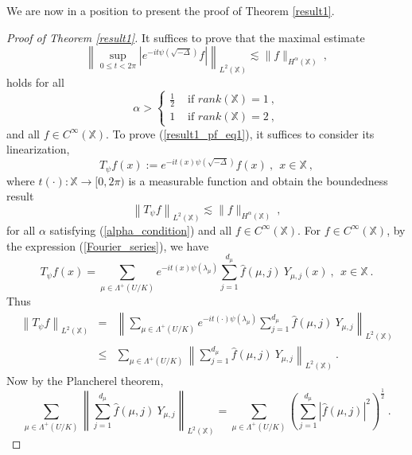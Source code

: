 \documentclass[12pt]{amsart}
\theoremstyle{definition}
\newcommand{\what}{\widehat}
\newcommand{\X}{\mathbb X}%
\numberwithin{equation}{section}
\begin{document}
We are now in a position to present the proof of Theorem \ref{result1}.
\begin{proof}[Proof of Theorem \ref{result1}]
It suffices to prove that the maximal estimate
\begin{equation} \label{result1_pf_eq1}
\left\|\sup_{0 \le t < 2\pi} \left|e^{-it\psi\left(\sqrt{-\Delta}\right)} f \right|\right\|_{L^2(\X)} \lesssim \|f\|_{H^\alpha(\X)}\:,
\end{equation}
holds for all 
\begin{equation} \label{alpha_condition} 
\alpha > \begin{cases}
	 \frac{1}{2}  &\text{ if } rank(\X)=1\:, \\
	 1  &\text{ if } rank(\X)=2\:,
	\end{cases}
\end{equation}
and all $f \in C^\infty(\X)$. To prove (\ref{result1_pf_eq1}), it suffices to consider its linearization,
\begin{equation*}
T_\psi f(x):= e^{-it(x)\psi\left(\sqrt{-\Delta}\right)} f(x)\:,\:\: x \in \X\:,
\end{equation*}
where $t(\cdot):\X \to [0,2\pi)$ is a measurable function and obtain the boundedness result
\begin{equation} \label{result1_pf_eq2}
\left\|T_\psi f\right\|_{L^2(\X)} \lesssim \|f\|_{H^\alpha(\X)}\:,
\end{equation}
for all $\alpha$ satisfying (\ref{alpha_condition}) and all $f \in C^\infty(\X)$. For $f \in C^\infty(\X)$, by the expression (\ref{Fourier_series}), we have
\begin{equation*}
T_\psi f(x) = \sum_{\mu \in \Lambda^+(U/K)} e^{-it(x)\psi\left(\lambda_\mu\right)}\sum_{j=1}^{d_\mu} \what{f}(\mu,j)\:Y_{\mu,j}(x)\:,\:\: x \in \X\:. 
\end{equation*}
Thus
\begin{eqnarray*}
\left\|T_\psi f\right\|_{L^2(\X)} &=& \left\|\sum_{\mu \in \Lambda^+(U/K)} e^{-it(\cdot)\psi\left(\lambda_\mu\right)}\sum_{j=1}^{d_\mu} \what{f}(\mu,j)\:Y_{\mu,j}\right\|_{L^2(\X)} \\
& \le & \sum_{\mu \in \Lambda^+(U/K)} \left\|\sum_{j=1}^{d_\mu} \what{f}(\mu,j)\:Y_{\mu,j}\right\|_{L^2(\X)}\:.
\end{eqnarray*}
Now by the Plancherel theorem,
\begin{equation*}
\sum_{\mu \in \Lambda^+(U/K)} \left\|\sum_{j=1}^{d_\mu} \what{f}(\mu,j)\:Y_{\mu,j}\right\|_{L^2(\X)} = \sum_{\mu \in \Lambda^+(U/K)} \left(\sum_{j=1}^{d_\mu} \left|\what{f}(\mu,j)\right|^2\right)^{\frac{1}{2}}\:.

\end{equation*}
\end{proof}
\end{document}
